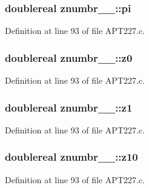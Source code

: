 \subsubsection[{\texorpdfstring{pi}{pi}}]{\setlength{\rightskip}{0pt plus 5cm}doublereal znumbr\+\_\+\_\+\+::pi}\hypertarget{structznumbr__1___aee6a3c0e4f0734ccb84894bc03b7ae1f}{}\label{structznumbr__1___aee6a3c0e4f0734ccb84894bc03b7ae1f}


Definition at line 93 of file A\+P\+T227.\+c.

\subsubsection[{\texorpdfstring{z0}{z0}}]{\setlength{\rightskip}{0pt plus 5cm}doublereal znumbr\+\_\+\_\+\+::z0}\hypertarget{structznumbr__1___a5e4bbb5461e3c60cccd1e626da8691c0}{}\label{structznumbr__1___a5e4bbb5461e3c60cccd1e626da8691c0}


Definition at line 93 of file A\+P\+T227.\+c.

\subsubsection[{\texorpdfstring{z1}{z1}}]{\setlength{\rightskip}{0pt plus 5cm}doublereal znumbr\+\_\+\_\+\+::z1}\hypertarget{structznumbr__1___a181e31396b67fb3cecfaab10992b1478}{}\label{structznumbr__1___a181e31396b67fb3cecfaab10992b1478}


Definition at line 93 of file A\+P\+T227.\+c.

\subsubsection[{\texorpdfstring{z10}{z10}}]{\setlength{\rightskip}{0pt plus 5cm}doublereal znumbr\+\_\+\_\+\+::z10}\hypertarget{structznumbr__1___a070ec0b04ea56c1ab3b6e41a7f8ea190}{}\label{structznumbr__1___a070ec0b04ea56c1ab3b6e41a7f8ea190}


Definition at line 93 of file A\+P\+T227.\+c.

